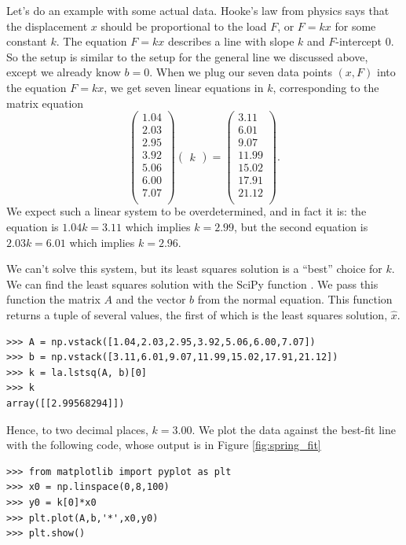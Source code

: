 Let's do an example with some actual data. 
Hooke's law from physics says that the displacement $x$ should be proportional to the load $F$, or $F = kx$ for some constant $k$.
The equation $F=kx$ describes a line with slope $k$ and $F$-intercept 0.
So the setup is similar to the setup for the general line we discussed above, except we already know $b=0$.
When we plug our seven data points $(x,F)$ into the equation $F=kx$, we get seven linear equations in $k$, corresponding to the matrix equation
\[
\begin{pmatrix}
1.04\\
2.03\\
2.95\\
3.92\\
5.06\\
6.00\\
7.07\\
\end{pmatrix}
\begin{pmatrix}k\end{pmatrix} =
\begin{pmatrix}
3.11\\
6.01\\
9.07\\
11.99\\
15.02\\
17.91\\
21.12\\
\end{pmatrix}.
\]
We expect such a linear system to be overdetermined, and in fact it is: the equation is $1.04k = 3.11$ which implies $k=2.99$, but the second equation is $2.03k = 6.01$ which implies $k=2.96$.

We can't solve this system, but its least squares solution is a ``best'' choice for $k$.
We can find the least squares solution with the SciPy function . We pass this function the matrix $A$ and the vector $b$ from the normal equation. 
This function returns a tuple of several values, the first of which is the least squares solution, $\widehat{x}$.
\begin{lstlisting}
>>> A = np.vstack([1.04,2.03,2.95,3.92,5.06,6.00,7.07])
>>> b = np.vstack([3.11,6.01,9.07,11.99,15.02,17.91,21.12])
>>> k = la.lstsq(A, b)[0]
>>> k
array([[2.99568294]])
\end{lstlisting}
Hence, to two decimal places, $k = 3.00$.
We plot the data against the best-fit line with the following code, whose output is in Figure \ref{fig:spring_fit}

\begin{lstlisting}
>>> from matplotlib import pyplot as plt
>>> x0 = np.linspace(0,8,100)
>>> y0 = k[0]*x0
>>> plt.plot(A,b,'*',x0,y0)
>>> plt.show()
\end{lstlisting}

